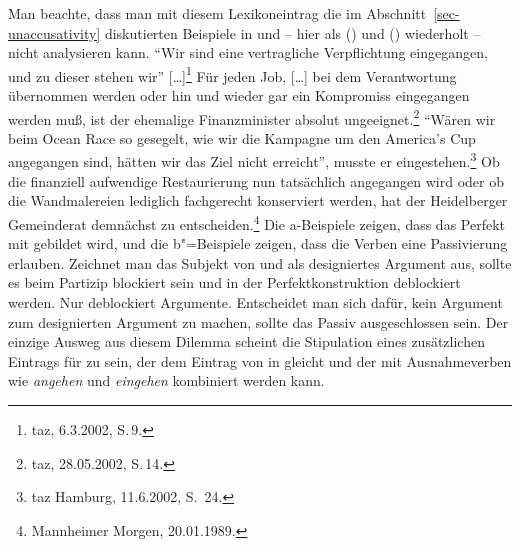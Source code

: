 Man beachte, dass man mit diesem Lexikoneintrag die im Abschnitt~\ref{sec-unaccusativity} 
diskutierten Beispiele in  und  --
hier als () und () wiederholt -- nicht analysieren kann. 
\eal
\label{bsp-eingegangen-all-zwei}
\ex{}
"`Wir sind eine vertragliche Verpflichtung eingegangen, und zu dieser stehen wir"' [\ldots]\footnote{
        taz, 6.3.2002, S.\,9.%
}
\ex\label{bsp-eingegangen-zwei}
Für jeden Job, [\ldots] bei dem Verantwortung übernommen werden oder hin und wieder gar
    ein Kompromiss eingegangen werden muß, ist der ehemalige Finanzminister absolut ungeeignet.\footnote{
        taz, 28.05.2002, S.\,14.%
    }
%
\zl
\eal
\label{bsp-angegangen-all-zwei}
\ex{}
"`Wären wir beim Ocean Race so gesegelt, wie wir die Kampagne um den America's Cup angegangen sind, 
hätten wir das Ziel nicht erreicht"', musste er eingestehen.\footnote{
        taz Hamburg, 11.6.2002, S.\, 24.%
}
%
\ex\label{bsp-angegangen-zwei}
Ob die finanziell
aufwendige Restaurierung nun tatsächlich angegangen wird oder ob die Wandmalereien lediglich fachgerecht konserviert werden, hat der
Heidelberger Gemeinderat demnächst zu entscheiden.\footnote{
        Mannheimer Morgen, 20.01.1989.%
}
\zl
Die a-Beispiele zeigen, dass das Perfekt mit \sein gebildet wird, und die b"=Beispiele zeigen, dass
die Verben eine Passivierung erlauben.
Zeichnet man das Subjekt von  und  
als designiertes Argument aus, sollte es beim Partizip blockiert sein und in der
Perfektkonstruktion deblockiert werden. Nur \haben deblockiert Argumente.
Entscheidet man sich dafür, kein Argument zum designierten Argument zu machen,
sollte das Passiv ausgeschlossen sein. Der einzige Ausweg aus diesem Dilemma
scheint die Stipulation eines zusätzlichen Eintrags für \sein zu sein,
der dem Eintrag von \haben in  gleicht und der 
mit Ausnahmeverben wie \emph{angehen} und \emph{eingehen} kombiniert werden kann.

